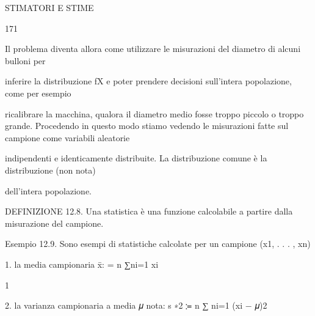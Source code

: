 \documentclass[a4paper,portrait,12pt]{article}
\begin{document}
\begin{flushleft}
 STIMATORI E STIME
\end{flushleft}





171





\begin{flushleft}
Il problema diventa allora come utilizzare le misurazioni del diametro di alcuni bulloni per
\end{flushleft}


\begin{flushleft}
inferire la distribuzione fX e poter prendere decisioni sull'intera popolazione, come per esempio
\end{flushleft}


\begin{flushleft}
ricalibrare la macchina, qualora il diametro medio fosse troppo piccolo o troppo grande. Procedendo in questo modo stiamo vedendo le misurazioni fatte sul campione come variabili aleatorie
\end{flushleft}


\begin{flushleft}
indipendenti e identicamente distribuite. La distribuzione comune \`{e} la distribuzione (non nota)
\end{flushleft}


\begin{flushleft}
dell'intera popolazione.
\end{flushleft}


\begin{flushleft}
DEFINIZIONE 12.8. Una statistica \`{e} una funzione calcolabile a partire dalla misurazione del campione.
\end{flushleft}


\begin{flushleft}
Esempio 12.9. Sono esempi di statistiche calcolate per un campione (x1, . . . , xn)
\end{flushleft}


\begin{flushleft}
1. la media campionaria x̄: = n ∑ni=1 xi
\end{flushleft}


1





\begin{flushleft}
2. la varianza campionaria a media 𝜇 nota: s ∗2 ≔ n ∑ ni=1 (xi $-$ 𝜇)2
\end{flushleft}
\end{document}
